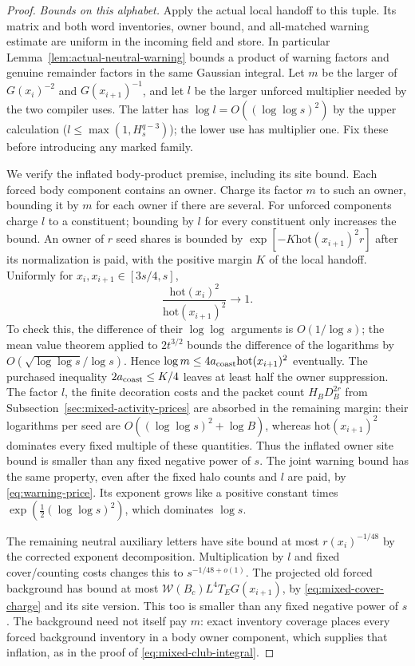 \begin{proof}
\emph{Bounds on this alphabet.}
Apply the actual local handoff to this tuple. Its matrix and both word
inventories, owner bound, and all-matched warning estimate are uniform
in the incoming field and store. In particular
Lemma~\ref{lem:actual-neutral-warning} bounds a product of warning
factors and genuine remainder factors in the same Gaussian integral.
Let $m$ be the larger of $G(x_i)^{-2}$ and $G(x_{i+1})^{-1}$, and let
$l$ be the larger unforced multiplier needed by the two compiler uses.
The latter has $\log l=O((\log\log s)^2)$ by the upper calculation
($l\le\max(1,H_s^{q-3})$); the lower use has multiplier one.
Fix these before introducing any marked family.

We verify the inflated body-product premise, including its site bound.
Each forced body component contains an owner. Charge its factor $m$
to such an owner, bounding it by $m$ for each owner if there are several.
For unforced components charge $l$ to a constituent; bounding by $l$
for every constituent only increases the bound. An owner of $r$ seed
shares is bounded by $\exp[-K\mathrm{hot}(x_{i+1})^2r]$ after its
normalization is paid, with the positive margin $K$ of the local
handoff. Uniformly for $x_i,x_{i+1}\in[3s/4,s]$,
\[
 \frac{\mathrm{hot}(x_i)^2}{\mathrm{hot}(x_{i+1})^2}\longrightarrow1.
\]
To check this, the difference of their $\log\log$ arguments is
$O(1/\log s)$; the mean value theorem applied to $2t^{3/2}$
bounds the difference of the logarithms by
$O(\sqrt{\log\log s}/\log s)$. Hence $\log m\le
4a_{\rm coast}\mathrm{hot}(x_{i+1})^2$ eventually. The purchased
inequality $2a_{\rm coast}\le K/4$ leaves at least half the owner
suppression. The factor $l$, the finite decoration costs and the
packet count $H_BD_B^{2r}$ from
Subsection~\ref{sec:mixed-activity-prices} are absorbed in the remaining
margin: their logarithms per seed are $O((\log\log s)^2+\log B)$,
whereas $\mathrm{hot}(x_{i+1})^2$ dominates every fixed multiple of
these quantities. Thus the inflated owner site bound is smaller than
any fixed negative power of $s$. The joint warning bound has the same
property, even after the fixed halo counts and $l$ are paid, by
\eqref{eq:warning-price}. Its exponent grows like a positive constant
times $\exp(\tfrac12(\log\log s)^2)$, which dominates $\log s$.

The remaining neutral auxiliary letters have site bound at most
$r(x_i)^{-1/48}$ by the corrected exponent decomposition. Multiplication
by $l$ and fixed cover/counting costs changes this to
$s^{-1/48+o(1)}$. The projected old forced background has bound at
most $\mathcal W(B_c)L^4T_EG(x_{i+1})$, by
\eqref{eq:mixed-cover-charge} and its site version. This too is smaller
than any fixed negative power of $s$. The background need not itself
pay $m$: exact inventory coverage places every forced background
inventory in a body owner component, which supplies that inflation,
as in the proof of \eqref{eq:mixed-club-integral}.


\end{proof}
